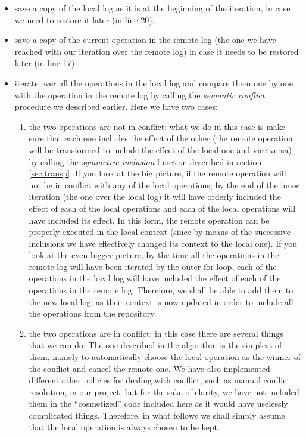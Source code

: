 \begin{itemize}
\item save a copy of the local log as it is at the beginning of the iteration, in case we need to
      restore it later (in line 20). 
\item save a copy of the current operation in the remote log (the one we have reached with our iteration
      over the remote log) in case it needs to be restored later (in line 17)
\item iterate over all the operations in the local log and compare them one by one with the operation
      in the remote log by calling the \emph{semantic conflict} procedure we described earlier. Here
      we have two cases:
\begin{enumerate}
\item the two operations are not in conflict: what we do in this case is make sure that each one includes
      the effect of the other (the remote operation will be transformed to include the effect of the local
      one and vice-versa) by calling the \emph{symmetric inclusion} function described in section
      \ref{sec:transp}. If you look at the big picture, if the remote operation will not be in conflict
      with any of the local operations, by the end of the inner iteration (the one over the local log)
      it will have orderly included the effect of each of the local operations and each of the local
      operations will have included its effect. In this form, the remote operation can be properly 
      executed in the local context (since by means of the successive inclusions we have effectively
      changed its context to the local one). If you look at the even bigger picture, by the time all
      the operations in the remote log will have been iterated by the outer for loop, each of the
      operations in the local log will have included the effect of each of the operations in the
      remote log. Therefore, we shall be able to add them to the new local log, as their context is now
      updated in order to include all the operations from the repository.
\item the two operations are in conflict: in this case there are several things that we can do. The one
      described in the algorithm is the simplest of them, namely to automatically choose the local
      operation as the winner of the conflict and cancel the remote one. We have also implemented
      different other policies for dealing with conflict, such as manual conflict resolution, in our
      project, but for the sake of clarity, we have not included 
      them in the ``cosmetized'' code included here as it would have uselessly complicated things.
      Therefore, in what follows we shall simply assume that the local operation is always chosen to be
      kept.
      

\end{enumerate}
\end{itemize}
